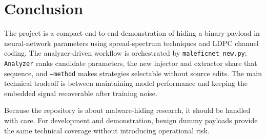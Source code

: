 \documentclass[11pt,a4paper]{article}
\newcommand{\code}[1]{\texttt{#1}}
\begin{document}
\section{Conclusion}

The project is a compact end-to-end demonstration of hiding a binary payload in neural-network parameters using spread-spectrum techniques and LDPC channel coding. The analyzer-driven workflow is orchestrated by \code{maleficnet\_new.py}; \code{Analyzer} ranks candidate parameters, the new injector and extractor share that sequence, and \code{--method} makes strategies selectable without source edits. The main technical tradeoff is between maintaining model performance and keeping the embedded signal recoverable after training noise.

Because the repository is about malware-hiding research, it should be handled with care. For development and demonstration, benign dummy payloads provide the same technical coverage without introducing operational risk.
\end{document}
